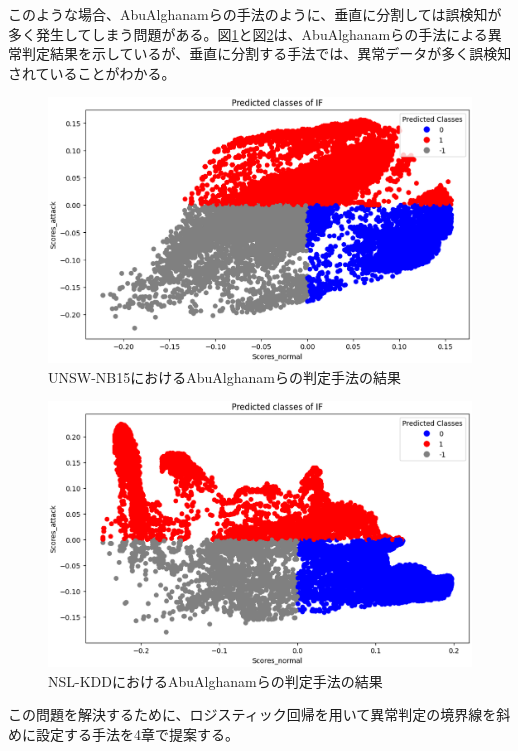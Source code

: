 \documentclass{css}
\begin{document}
このような場合、AbuAlghanamらの手法\cite{AbuAlghanam2023-sx}のように、垂直に分割しては誤検知が多く発生してしまう問題がある。図\ref{fig:UNSW-NB152}と図\ref{fig:NSL-KDD2}は、AbuAlghanamらの手法による異常判定結果を示しているが、垂直に分割する手法では、異常データが多く誤検知されていることがわかる。

\begin{figure}[ht]
    \centering
    \includegraphics[width=\linewidth]{pictures/eps/UNSW-NB152.eps}
    \caption{UNSW-NB15におけるAbuAlghanamらの判定手法の結果}
    \label{fig:UNSW-NB152}
\end{figure}

\begin{figure}[ht]
    \centering
    \includegraphics[width=\linewidth]{pictures/eps/NSL-KDD2.eps}
    \caption{NSL-KDDにおけるAbuAlghanamらの判定手法の結果}
    \label{fig:NSL-KDD2}
\end{figure}

この問題を解決するために、ロジスティック回帰を用いて異常判定の境界線を斜めに設定する手法を4章で提案する。
\end{document}
